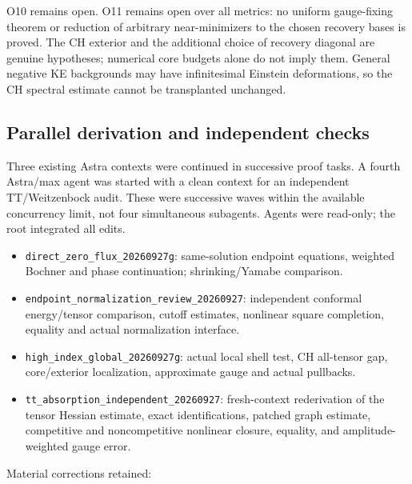 \documentclass[
  10pt,
]{article}
\providecommand{\tightlist}{%
  \setlength{\itemsep}{0pt}\setlength{\parskip}{0pt}}
\begin{document}
O10 remains open. O11 remains open over all metrics: no uniform
gauge-fixing theorem or reduction of arbitrary near-minimizers to the
chosen recovery bases is proved. The CH exterior and the additional
choice of recovery diagonal are genuine hypotheses; numerical core
budgets alone do not imply them. General negative KE backgrounds may
have infinitesimal Einstein deformations, so the CH spectral estimate
cannot be transplanted unchanged.

\hypertarget{parallel-derivation-and-independent-checks}{%
\subsection{Parallel derivation and independent
checks}\label{parallel-derivation-and-independent-checks}}

Three existing Astra contexts were continued in successive proof tasks.
A fourth Astra/max agent was started with a clean context for an
independent TT/Weitzenbock audit. These were successive waves within the
available concurrency limit, not four simultaneous subagents. Agents
were read-only; the root integrated all edits.

\begin{itemize}
\tightlist
\item
  \nolinkurl{direct_zero_flux_20260927g}: same-solution endpoint equations,
  weighted Bochner and phase continuation; shrinking/Yamabe comparison.
\item
  \nolinkurl{endpoint_normalization_review_20260927}: independent conformal
  energy/tensor comparison, cutoff estimates, nonlinear square
  completion, equality and actual normalization interface.
\item
  \nolinkurl{high_index_global_20260927g}: actual local shell test, CH all-tensor
  gap, core/exterior localization, approximate gauge and actual
  pullbacks.
\item
  \nolinkurl{tt_absorption_independent_20260927}: fresh-context rederivation of
  the tensor Hessian estimate, exact identifications, patched graph
  estimate, competitive and noncompetitive nonlinear closure, equality,
  and amplitude-weighted gauge error.
\end{itemize}

Material corrections retained:
\end{document}

